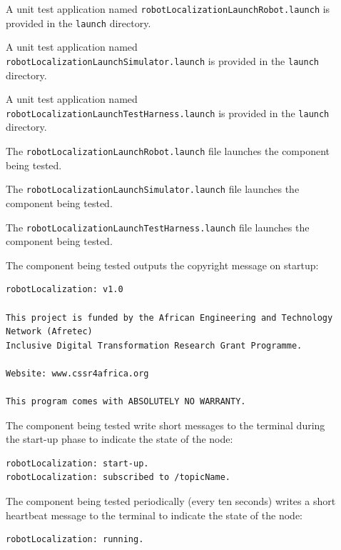 \documentclass{CSSRforAfrica}
\newcommand{\checkboxChecked}{\fbox{\ding{51}}} %
\newcommand{\checkboxDashed}{\fbox{--}}         %
\begin{document}
\begin{description}

\item[\checkboxDashed] A unit test application named {\small \verb+robotLocalizationLaunchRobot.launch+} is provided in the {\small \verb+launch+} directory. 

\item[\checkboxDashed] A unit test application named {\small \verb+robotLocalizationLaunchSimulator.launch+} is provided in the {\small \verb+launch+} directory.

\item[\checkboxDashed] A unit test application named {\small \verb+robotLocalizationLaunchTestHarness.launch+} is provided in the {\small \verb+launch+} directory.

\item[\checkboxDashed] The {\small \verb+robotLocalizationLaunchRobot.launch+} file  launches the component being tested.

\item[\checkboxDashed] The {\small \verb+robotLocalizationLaunchSimulator.launch+} file  launches the component being tested.

\item[\checkboxDashed] The {\small \verb+robotLocalizationLaunchTestHarness.launch+} file  launches the component being tested.

\item[\checkboxChecked] The component being tested outputs the copyright message on startup:  \\ 
{\scriptsize
\begin{verbatim}
robotLocalization: v1.0

This project is funded by the African Engineering and Technology Network (Afretec) 
Inclusive Digital Transformation Research Grant Programme. 

Website: www.cssr4africa.org

This program comes with ABSOLUTELY NO WARRANTY.
\end{verbatim}
}

\item[\checkboxChecked] The component being tested write short messages to the terminal  during the start-up phase to indicate the state of the node:
{\small
\begin{verbatim}
robotLocalization: start-up.
robotLocalization: subscribed to /topicName.
\end{verbatim}
} 

\item[\checkboxChecked] The component being tested periodically (every ten seconds) writes a short heartbeat message to the terminal to indicate the state of the node:
{\small
\begin{verbatim}
robotLocalization: running.
\end{verbatim}
}


\end{description}
\end{document}
